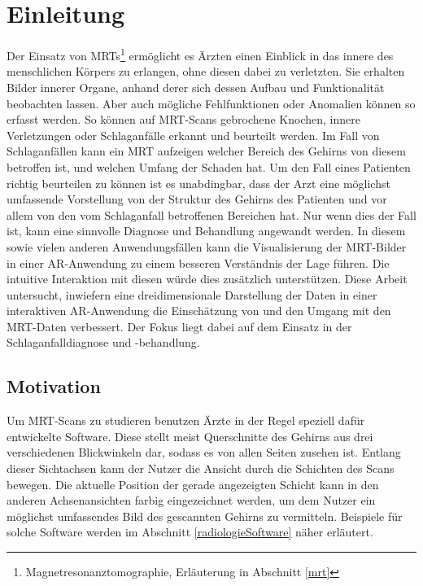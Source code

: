 %
\chapter{Einleitung}

Der Einsatz von MRTs\footnote{ Magnetresonanztomographie, Erläuterung in Abschnitt \ref{mrt}} ermöglicht es Ärzten einen Einblick in das innere des menschlichen Körpers zu erlangen, ohne diesen dabei zu verletzten. Sie erhalten Bilder innerer Organe, anhand derer sich dessen Aufbau und Funktionalität beobachten lassen. Aber auch mögliche Fehlfunktionen oder Anomalien können so erfasst werden. So können auf MRT-Scans gebrochene Knochen, innere Verletzungen oder Schlaganfälle erkannt und beurteilt werden. Im Fall von Schlaganfällen kann ein MRT aufzeigen welcher Bereich des Gehirns von diesem betroffen ist, und welchen Umfang der Schaden hat.
Um den Fall eines Patienten richtig beurteilen zu können ist es unabdingbar, dass der Arzt eine möglichst umfassende Vorstellung von der Struktur des Gehirns des Patienten und vor allem von den vom Schlaganfall betroffenen Bereichen hat. Nur wenn dies der Fall ist, kann eine sinnvolle Diagnose und Behandlung angewandt werden.
In diesem sowie vielen anderen Anwendungsfällen kann die Visualisierung der MRT-Bilder in einer AR-Anwendung zu einem besseren Verständnis der Lage führen. Die intuitive Interaktion mit diesen würde dies zusätzlich unterstützen. 
Diese Arbeit untersucht, inwiefern eine dreidimensionale Darstellung der Daten in einer interaktiven AR-Anwendung die Einschätzung von und den Umgang mit den MRT-Daten verbessert. Der Fokus liegt dabei auf dem Einsatz in der Schlaganfalldiagnose und -behandlung.  



\section{Motivation}
\label{motivation}

Um MRT-Scans zu studieren benutzen Ärzte in der Regel speziell dafür entwickelte Software. Diese stellt meist Querschnitte des Gehirns aus drei verschiedenen Blickwinkeln dar, sodass es von allen Seiten zusehen ist. Entlang dieser Sichtachsen kann der Nutzer die Ansicht durch die Schichten des Scans bewegen. Die aktuelle Position der gerade angezeigten Schicht kann in den anderen Achsenansichten farbig eingezeichnet werden, um dem Nutzer ein möglichst umfassendes Bild des gescannten Gehirns zu vermitteln. 
Beispiele für solche Software werden im Abschnitt \ref{radiologieSoftware} näher erläutert.

